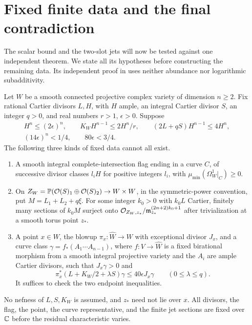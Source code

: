 \section{Fixed finite data and the final contradiction}\label{sec:frobenius}

The scalar bound and the two-slot jets will now be tested against one
independent theorem. We state all its hypotheses before constructing
the remaining data. Its independent proof in
\cite{OpenAIAbundance2026} uses neither abundance nor logarithmic
subadditivity.

\begin{theorem}
\label{thm:finite-data}
Let $W$ be a smooth connected projective complex variety of dimension
$n\ge2$. Fix rational Cartier divisors $L,H$, with $H$ ample, an
integral Cartier divisor $S$, an integer $q>0$, and real numbers
$r>1$, $\epsilon>0$. Suppose
\begin{gather*}
 H^n\le(2\epsilon)^n,\qquad
 K_WH^{n-1}\le 2H^n/r,\qquad
 (2L+qS)H^{n-1}\le4H^n,\\
 (14\epsilon)^n<1/4,\qquad80\epsilon<3/4.
\end{gather*}
The following three kinds of fixed data cannot all exist.
\begin{enumerate}[label=\textup{(\roman*)}]
\item A smooth integral complete-intersection flag ending in a curve
$C$, of successive divisor classes $l_iH$ for positive integers $l_i$,
with $\mu_{\min}(\Omega_W^1|_C)\ge0$.
\item On $Z_W=\mathbb P(\mathcal O(S)_1\oplus\mathcal O(S)_2)\to W\times W$,
in the symmetric-power convention, put $M=L_1+L_2+q\xi$.
For some integer $k_0>0$ with $k_0L$ Cartier, finitely many sections of
$k_0M$ surject onto
$\mathcal O_{Z_W,z_*}/\mathfrak m_{z_*}^{(2n+2)k_0+1}$ after
trivialization at a smooth torus point $z_*$.
\item A point $x\in W$, the blowup $\pi_x:\widehat W\to W$
with exceptional divisor $J_x$, and a curve class
$\gamma=f_*(A_1\cdots A_{n-1})$, where
$f:V\to\widehat W$ is a fixed birational morphism from a smooth
integral projective variety and the $A_i$ are ample Cartier divisors,
such that $J_x\gamma>0$ and
\[
 \pi_x^*(L+K_W/2+\lambda S)\gamma
 \le40\epsilon J_x\gamma\qquad(0\le\lambda\le q).
\]
It suffices to check the two endpoint inequalities.
\end{enumerate}
No nefness of $L,S,K_W$ is assumed, and $z_*$ need not lie over $x$.
All divisors, the flag, the point, the curve representative, and the
finite jet sections are fixed over $\mathbb C$ before the residual
characteristic varies.
\end{theorem}

